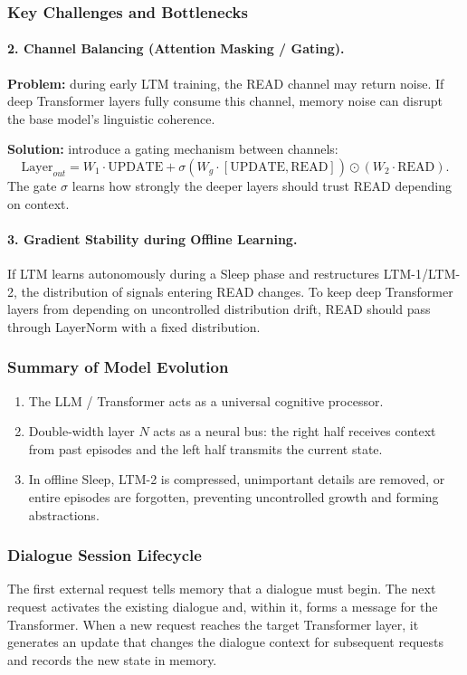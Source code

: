 \documentclass[11pt,a4paper]{article}
\begin{document}
\subsubsection*{Key Challenges and Bottlenecks}
\paragraph{2. Channel Balancing (Attention Masking / Gating).}
\textbf{Problem:} during early LTM training, the READ channel may return noise. If deep Transformer layers fully consume this channel, memory noise can disrupt the base model's linguistic coherence.

\textbf{Solution:} introduce a gating mechanism between channels:
\begin{equation}
\mathrm{Layer}_{out}=W_1\cdot\mathrm{UPDATE}+\sigma\!\left(W_g\cdot[\mathrm{UPDATE},\mathrm{READ}]\right)\odot\left(W_2\cdot\mathrm{READ}\right).
\end{equation}
The gate $\sigma$ learns how strongly the deeper layers should trust READ depending on context.

\paragraph{3. Gradient Stability during Offline Learning.}
If LTM learns autonomously during a Sleep phase and restructures LTM-1/LTM-2, the distribution of signals entering READ changes. To keep deep Transformer layers from depending on uncontrolled distribution drift, READ should pass through LayerNorm with a fixed distribution.

\subsubsection*{Summary of Model Evolution}
\begin{enumerate}
\item The LLM / Transformer acts as a universal cognitive processor.
\item Double-width layer $N$ acts as a neural bus: the right half receives context from past episodes and the left half transmits the current state.
\item In offline Sleep, LTM-2 is compressed, unimportant details are removed, or entire episodes are forgotten, preventing uncontrolled growth and forming abstractions.
\end{enumerate}

\subsubsection*{Dialogue Session Lifecycle}
The first external request tells memory that a dialogue must begin. The next request activates the existing dialogue and, within it, forms a message for the Transformer. When a new request reaches the target Transformer layer, it generates an update that changes the dialogue context for subsequent requests and records the new state in memory.
\end{document}
